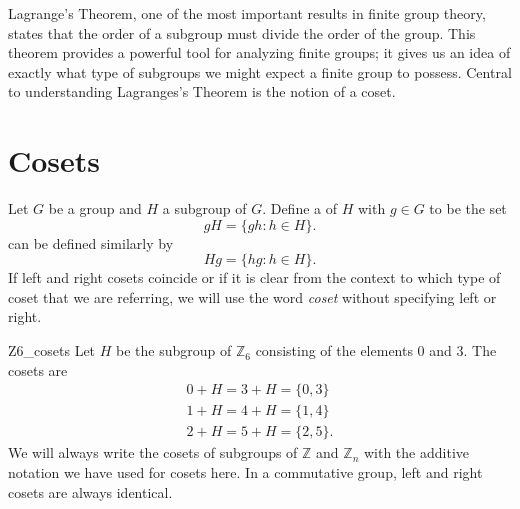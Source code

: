 

Lagrange's Theorem, one of the most important results in finite group theory, states that the order of a subgroup must divide the order of the group.  This theorem provides a powerful tool for analyzing finite groups; it gives us an idea of exactly what type of subgroups we might expect a finite group to possess.  Central to understanding Lagranges's Theorem is the notion of a coset.


\section{Cosets}

Let $G$ be a group and $H$ a subgroup of $G$.  Define a  of $H$ with  $g \in G$ to be the set 
\[
gH = \{ gh : h \in H \}.
\]
 can be defined similarly by
\[
Hg = \{ hg : h \in H \}.
\]
If left and right cosets coincide or if it is clear from the context to which type of coset that we are referring, we will use the word \emph{coset} without specifying left or right. 

\begin{example}{Z6_cosets}
Let $H$ be the subgroup of ${\mathbb Z}_6$ consisting of the elements 0 and 3.  The cosets are 
\begin{gather*}
0 + H = 3 + H = \{ 0, 3 \} \\
1 + H = 4 + H = \{ 1, 4 \} \\
2 + H = 5 + H = \{ 2, 5 \}.
\end{gather*}
We will always write the cosets of subgroups of ${\mathbb Z}$ and ${\mathbb Z}_n$ with the additive notation we have used for cosets here.  In a commutative group, left and right cosets are always identical. 
\end{example}

